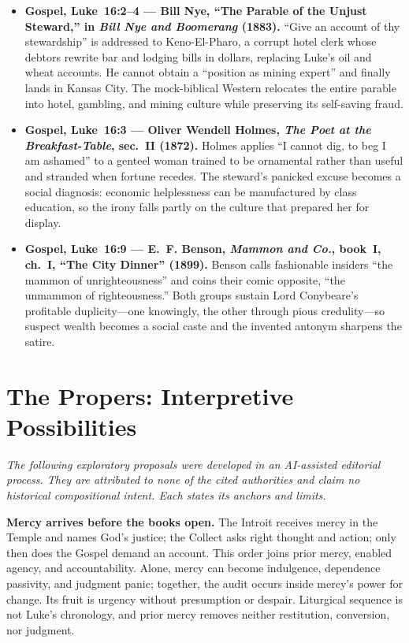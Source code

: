 {\small
\begin{itemize}[itemsep=0.35em,topsep=0.2em,parsep=0pt]
\item \textbf{Gospel, Luke~16:2--4 --- Bill Nye, ``The Parable of the Unjust Steward,'' in \emph{Bill Nye and Boomerang} (1883).} ``Give an account of thy stewardship'' is addressed to Keno-El-Pharo, a corrupt hotel clerk whose debtors rewrite bar and lodging bills in dollars, replacing Luke's oil and wheat accounts. He cannot obtain a ``position as mining expert'' and finally lands in Kansas City. The mock-biblical Western relocates the entire parable into hotel, gambling, and mining culture while preserving its self-saving fraud.

\item \textbf{Gospel, Luke~16:3 --- Oliver Wendell Holmes, \emph{The Poet at the Breakfast-Table}, sec.~II (1872).} Holmes applies ``I cannot dig, to beg I am ashamed'' to a genteel woman trained to be ornamental rather than useful and stranded when fortune recedes. The steward's panicked excuse becomes a social diagnosis: economic helplessness can be manufactured by class education, so the irony falls partly on the culture that prepared her for display.

\item \textbf{Gospel, Luke~16:9 --- E.~F. Benson, \emph{Mammon and Co.}, book~I, ch.~I, ``The City Dinner'' (1899).} Benson calls fashionable insiders ``the mammon of unrighteousness'' and coins their comic opposite, ``the unmammon of righteousness.'' Both groups sustain Lord Conybeare's profitable duplicity---one knowingly, the other through pious credulity---so suspect wealth becomes a social caste and the invented antonym sharpens the satire.
\end{itemize}
}

\sectionguard
\section*{The Propers: Interpretive Possibilities}

\noindent\emph{The following exploratory proposals were developed in an AI-assisted editorial process. They are attributed to none of the cited authorities and claim no historical compositional intent. Each states its anchors and limits.}

\noindent\textbf{Mercy arrives before the books open.\enspace{}}
The Introit receives mercy in the Temple and names God's justice; the Collect asks right thought and action; only then does the Gospel demand an account. This order joins prior mercy, enabled agency, and accountability. Alone, mercy can become indulgence, dependence passivity, and judgment panic; together, the audit occurs inside mercy's power for change. Its fruit is urgency without presumption or despair. Liturgical sequence is not Luke's chronology, and prior mercy removes neither restitution, conversion, nor judgment.

